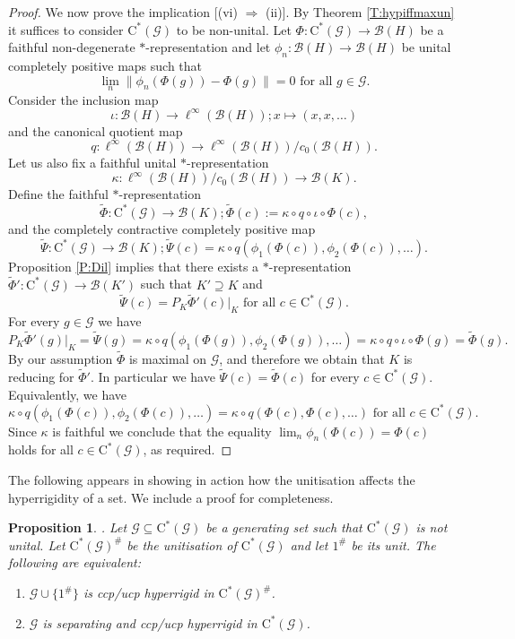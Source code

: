 \documentclass[11pt, draft]{amsart}
\numberwithin{equation}{section}
\theoremstyle{plain}
\newtheorem{proposition}[theorem]{Proposition}
\theoremstyle{definition}
\theoremstyle{remark}
\newcommand{\B}{{\mathcal{B}}}
\newcommand{\G}{{\mathcal{G}}}
\def\io{\iota}
\def\ka{\kappa}
\newcommand{\foral}{\text{ for all }}
\newcommand{\ca}{\mathrm{C}^*}
\newcommand{\wt}{\widetilde}
\begin{document}
\begin{proof}
We now prove the implication [(vi) $\Rightarrow$ (ii)]. By Theorem \ref{T:hypiffmaxun} it suffices to consider $\ca(\G)$ to be non-unital.
Let $\Phi \colon \ca(\G) \to \B(H)$ be a faithful non-degenerate $*$-representation and let $\phi_n \colon \B(H) \to \B(H)$ be unital completely positive maps such that
\[
\lim_n \|\phi_n(\Phi(g)) - \Phi(g)\| = 0 \foral g \in \G.
\]
Consider the inclusion map
\[
\io \colon \B(H) \to \ell^{\infty}(\B(H)); x \mapsto (x, x, \dots)
\]
and the canonical quotient map
\[
q \colon \ell^{\infty}(\B(H)) \to \ell^\infty(\B(H))/c_0(\B(H)).
\]
Let us also fix a faithful unital $*$-representation
\[
\ka \colon \ell^\infty(\B(H))/c_0(\B(H)) \to \B(K).
\]
Define the faithful $*$-representation
\[
\wt{\Phi} \colon \ca(\G) \to \B(K); \wt{\Phi}(c) := \ka \circ q \circ \io \circ \Phi(c),
\]
and the completely contractive completely positive map
\[
\wt{\Psi} \colon \ca(\G) \to \B(K); \wt{\Psi}(c) = \ka \circ q ( \phi_1(\Phi(c)), \phi_2(\Phi(c)), \dots ).
\]
Proposition \ref{P:Dil} implies that there exists a $*$-representation $\wt{\Phi}'\colon \ca(\G)\to \B(K')$ such that $K'\supseteq K$ and
\[
\wt{\Psi}(c)=P_K \wt{\Phi}'(c)|_K \foral c\in \ca(\G).
\]
For every $g \in \G$ we have
\[
P_K \wt{\Phi}'(g)|_K
=
\wt{\Psi}(g)
=
\ka \circ q ( \phi_1(\Phi(g)), \phi_2(\Phi(g)), \dots )
=
\ka \circ q \circ \io \circ \Phi(g)
=
\wt{\Phi}(g).
\]
By our assumption $\wt{\Phi}$ is maximal on $\G$, and therefore we obtain that $K$ is reducing for $\wt{\Phi}'$.
In particular we have $\wt{\Psi}(c)=\wt{\Phi}(c)$ for every $c\in\ca(\G)$.
Equivalently, we have
\[
\ka \circ q(\phi_1(\Phi(c)), \phi_2(\Phi(c)), \dots)
=
\ka \circ q(\Phi(c), \Phi(c), \dots)
\foral
c \in \ca(\G).
\]
Since $\ka$ is faithful we conclude that the equality $\lim_n \phi_n(\Phi(c)) = \Phi(c)$ holds for all $c \in \ca(\G)$, as required.
\end{proof}

The following appears in \cite[Proposition 3.8, Theorem 3.9]{Sal17} showing in action how the unitisation affects the hyperrigidity of a set.
We include a proof for completeness.

\begin{proposition} \label{P:unit ccp/ucp} \cite[Proposition 3.8, Theorem 3.9]{Sal17}.
Let $\G \subseteq \ca(\G)$ be a generating set such that $\ca(\G)$ is not unital.
Let $\ca(\G)^{\#}$ be the unitisation of $\ca(\G)$ and let $1^{\#}$ be its unit.
The following are equivalent:
\begin{enumerate}
\item $\G \cup \{1^{\#}\}$ is ccp/ucp hyperrigid in $\ca(\G)^\#$.
\item $\G$ is separating and ccp/ucp hyperrigid in $\ca(\G)$.
\end{enumerate}
\end{proposition}
\end{document}
